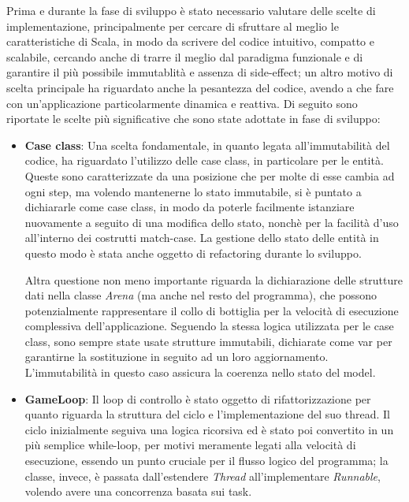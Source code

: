 Prima e durante la fase di sviluppo è stato necessario valutare delle scelte di implementazione, principalmente per cercare di sfruttare al meglio le caratteristiche di Scala, in modo da scrivere del codice intuitivo, compatto e scalabile, cercando anche di trarre il meglio dal paradigma funzionale e di garantire il più possibile immutablità e assenza di side-effect; un altro motivo di scelta principale ha riguardato anche la pesantezza del codice, avendo a che fare con un'applicazione particolarmente dinamica e reattiva. Di seguito sono riportate le scelte più significative che sono state adottate in fase di sviluppo:

\begin{itemize}
    \item \textbf{Case class}: Una scelta fondamentale, in quanto legata all'immutabilità del codice, ha riguardato l'utilizzo delle case class, in particolare per le entità. Queste sono caratterizzate da una posizione che per molte di esse cambia ad ogni step, ma volendo mantenerne lo stato immutabile, si è puntato a dichiararle come case class, in modo da poterle facilmente istanziare nuovamente a seguito di una modifica dello stato, nonchè per la facilità d'uso all'interno dei costrutti match-case. La gestione dello stato delle entità in questo modo è stata anche oggetto di refactoring durante lo sviluppo.
    
    Altra questione non meno importante riguarda la dichiarazione delle strutture dati nella classe \textit{Arena} (ma anche nel resto del programma), che possono potenzialmente rappresentare il collo di bottiglia per la velocità di esecuzione complessiva dell'applicazione. Seguendo la stessa logica utilizzata per le case class, sono sempre state usate strutture immutabili, dichiarate come var per garantirne la sostituzione in seguito ad un loro aggiornamento. L'immutabilità in questo caso assicura la coerenza nello stato del model.

    \item \textbf{GameLoop}: Il loop di controllo è stato oggetto di rifattorizzazione per quanto riguarda la struttura del ciclo e l'implementazione del suo thread. Il ciclo inizialmente seguiva una logica ricorsiva ed è stato poi convertito in un più semplice while-loop, per motivi meramente legati alla velocità di esecuzione, essendo un punto cruciale per il flusso logico del programma; la classe, invece, è passata dall'estendere \textit{Thread} all'implementare \textit{Runnable}, volendo avere una concorrenza basata sui task.
\end{itemize}